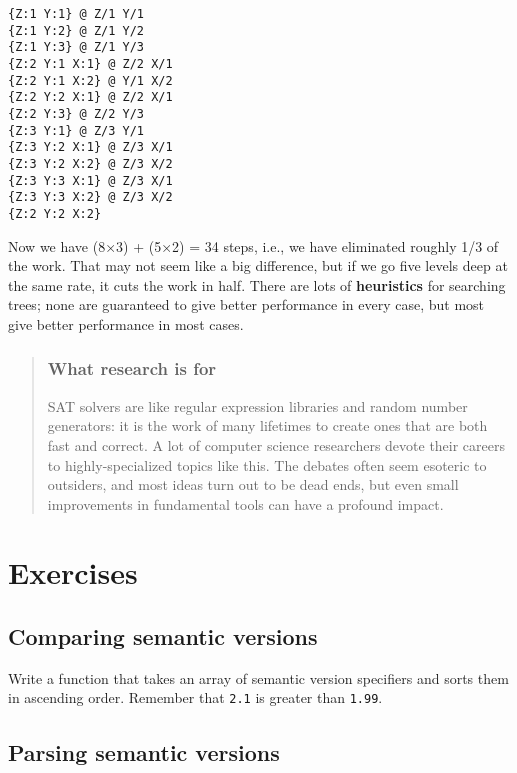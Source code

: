 \documentclass[krantzl]{krantz}
\newcommand{\glossref}[1]{\textbf{#1}}
\newenvironment{callout}{\savenotes\begin{tBox}\begin{quotation}\toggletrue{inbox}\renewcommand{\thempfootnote}{\arabic{footnote}}}{\end{quotation}\vspace{\baselineskip}\end{tBox}\togglefalse{inbox}\spewnotes}
\begin{document}
\begin{lstlisting}[frame=tblr,backgroundcolor=\color{black!5}]
{Z:1 Y:1} @ Z/1 Y/1
{Z:1 Y:2} @ Z/1 Y/2
{Z:1 Y:3} @ Z/1 Y/3
{Z:2 Y:1 X:1} @ Z/2 X/1
{Z:2 Y:1 X:2} @ Y/1 X/2
{Z:2 Y:2 X:1} @ Z/2 X/1
{Z:2 Y:3} @ Z/2 Y/3
{Z:3 Y:1} @ Z/3 Y/1
{Z:3 Y:2 X:1} @ Z/3 X/1
{Z:3 Y:2 X:2} @ Z/3 X/2
{Z:3 Y:3 X:1} @ Z/3 X/1
{Z:3 Y:3 X:2} @ Z/3 X/2
{Z:2 Y:2 X:2}
\end{lstlisting}



Now we have (8×3) + (5×2) = 34 steps,
i.e.,
we have eliminated roughly 1/3 of the work.
That may not seem like a big difference,
but if we go five levels deep at the same rate,
it cuts the work in half.
There are lots of \glossref{heuristics} for searching trees;
none are guaranteed to give better performance in every case,
but most give better performance in most cases.

\begin{callout}


\subsubsection*{What research is for}


SAT solvers are like regular expression libraries and random number generators:
it is the work of many lifetimes to create ones that are both fast and correct.
A lot of computer science researchers devote their careers to highly-specialized topics like this.
The debates often seem esoteric to outsiders,
and most ideas turn out to be dead ends,
but even small improvements in fundamental tools can have a profound impact.

\end{callout}

\section{Exercises}\label{package-manager-exercises}

\subsection*{Comparing semantic versions}


Write a function that takes an array of semantic version specifiers
and sorts them in ascending order.
Remember that \texttt{2.1} is greater than \texttt{1.99}.

\subsection*{Parsing semantic versions}
\end{document}
